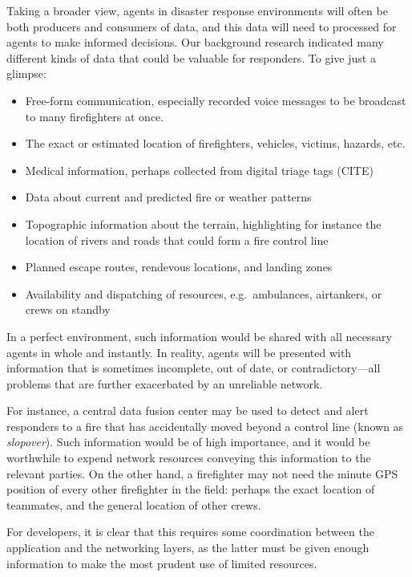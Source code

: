 \documentclass[]             %
{NASA}                       %
\theoremstyle{definition}
\providecommand{\tightlist}{%
  \setlength{\itemsep}{0pt}\setlength{\parskip}{0pt}}
\begin{document}
Taking a broader view, agents in disaster response environments will
often be both producers and consumers of data, and this data will need
to processed for agents to make informed decisions. Our background
research indicated many different kinds of data that could be valuable
for responders. To give just a glimpse:

\begin{itemize}
\tightlist
\item
  Free-form communication, especially recorded voice messages to be
  broadcast to many firefighters at once.
\item
  The exact or estimated location of firefighters, vehicles, victims,
  hazards, etc.
\item
  Medical information, perhaps collected from digital triage tags (CITE)
\item
  Data about current and predicted fire or weather patterns
\item
  Topographic information about the terrain, highlighting for instance
  the location of rivers and roads that could form a fire control line
\item
  Planned escape routes, rendevous locations, and landing zones
\item
  Availability and dispatching of resources, e.g.~ambulances,
  airtankers, or crews on standby
\end{itemize}

In a perfect environment, such information would be shared with all
necessary agents in whole and instantly. In reality, agents will be
presented with information that is sometimes incomplete, out of date, or
contradictory---all problems that are further exacerbated by an
unreliable network.

For instance, a central data fusion center may be used to detect and
alert responders to a fire that has accidentally moved beyond a control
line (known as \emph{slopover}). Such information would be of high
importance, and it would be worthwhile to expend network resources
conveying this information to the relevant parties. On the other hand, a
firefighter may not need the minute GPS position of every other
firefighter in the field: perhaps the exact location of teammates, and
the general location of other crews.

For developers, it is clear that this requires some coordination between
the application and the networking layers, as the latter must be given
enough information to make the most prudent use of limited resources.
\end{document}
